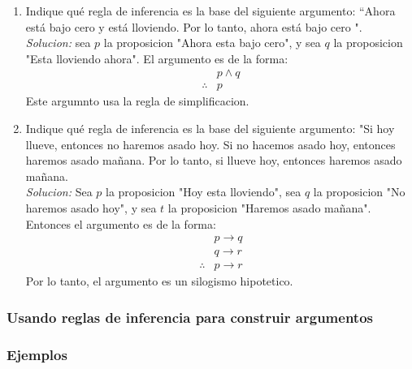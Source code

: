 \documentclass[]{article}
\begin{document}
\begin{enumerate}
	\item Indique qué regla de inferencia es la base del siguiente argumento: “Ahora está bajo cero y está lloviendo. Por lo tanto, ahora está bajo cero ".\\
	\textit{Solucion:} sea $p$ la proposicion "Ahora esta bajo cero", y sea $q$ la proposicion "Esta lloviendo ahora". El argumento es de la forma:
	\begin{equation*}
		\begin{aligned}
			&p \wedge q\\
			\therefore &p
		\end{aligned}
	\end{equation*}
	Este argumnto usa la regla de simplificacion.

	\item Indique qué regla de inferencia es la base del siguiente argumento:
	"Si hoy llueve, entonces no haremos asado hoy. Si no hacemos asado hoy, entonces haremos asado mañana. Por lo tanto, si llueve hoy, entonces haremos asado mañana.\\
	\textit{Solucion:} Sea $p$ la proposicion "Hoy esta lloviendo", sea $q$ la proposicion "No haremos asado hoy", y sea $t$ la proposicion "Haremos asado mañana". Entonces el argumento es de la forma:
	\begin{equation*}
		\begin{aligned}
			&p \rightarrow q\\
			&q \rightarrow r\\
			\therefore &p \rightarrow r
		\end{aligned}
	\end{equation*}
	Por lo tanto, el argumento es un silogismo hipotetico.
\end{enumerate}

\subsubsection*{Usando reglas de inferencia para construir argumentos}

\subsubsection*{Ejemplos}
\end{document}
